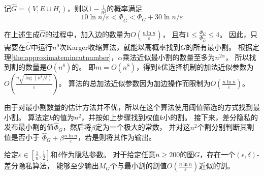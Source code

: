 记$\hat G=(V,E\cup H_i)$，则以$1-\frac1{n^2}$的概率满足
\begin{equation*}
    10\ln n/\varepsilon<\Phi_{\hat G}<\Phi_G+30\ln n/\varepsilon
\end{equation*}

在上述生成$\hat G$的过程中，加入边的数量为$O(\frac{n\ln n}{\varepsilon})$，
且有$1\leq \frac{\Phi_G}{\Phi_{\hat G}}\leq 4$。
因此，只需要在$\hat G$中运行$n^9$次Karger收缩算法，就能以高概率找到$G$的所有最小割。
根据定理\ref{the:approximatemincutnumber}，$\alpha$乘法近似最小割的数量至多为$n^{2\alpha}$，
所以找到割的数量是$O(n^8)$的。
即$m=O(n^8)$，得到$k$优选择机制的加法近似参数为$O(\frac{n\sqrt{\log(n^8/\delta)}}{\varepsilon})$。
算法的总加法近似参数因为加边操作而限制为$O(\frac{n\ln n}{\varepsilon})$。

由于对最小割数量的估计方法并不优，所以在这个算法使用阈值筛选的方式找到最小割。
算法定$k$的值为$n^2$，并按如上步骤找到权值$k$小的割。
接下来，差分隐私的发布最小割的值$\hat \Phi_G$，然后将$\beta$定为一个极大的常数，
并对这$n^2$个割分别判断其割值是否小于
$\hat \Phi_G+\beta \frac{n\ln n}{\varepsilon}$，若是则将其作为输出。
\begin{theorem}
    给定$\varepsilon\in[\frac 1n,\frac12]$和$\delta$作为隐私参数。
    对于给定任意$n\geq 200$的图$G$，存在一个$(\epsilon,\delta)$-差分隐私算法，
    能够至少输出$M_G$个与最小割的割值$O(\frac{n\ln n}{\varepsilon})$近似的割。
\end{theorem}